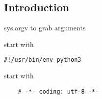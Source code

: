 
\subsection{Introduction}

sys.argv to grab arguments

start with

\begin{verbatim}
#!/usr/bin/env python3
\end{verbatim}

start with 

\begin{verbatim}
    # -*- coding: utf-8 -*-
\end{verbatim}
